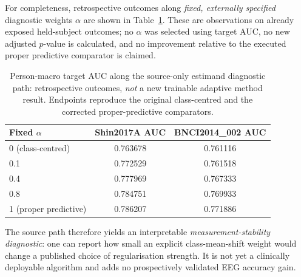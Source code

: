 For completeness, retrospective outcomes along
\emph{fixed, externally specified} diagnostic
weights $\alpha$ are shown in
Table~\ref{tab:v19-homotopy-outcomes}. These are
observations on already exposed held-subject
outcomes; no $\alpha$ was selected using target
AUC, no new adjusted $p$-value is calculated, and
no improvement relative to the executed proper
predictive comparator is claimed.
\begin{table}[tb]
\centering
\small
\caption{Person-macro target AUC along the source-only
estimand diagnostic path: retrospective outcomes,
\emph{not} a new trainable adaptive method result.
Endpoints reproduce the original class-centred
and the corrected proper-predictive comparators.}
\label{tab:v19-homotopy-outcomes}
\begin{tabular}{lcc}
\toprule
Fixed $\alpha$ & Shin2017A AUC & BNCI2014\_002 AUC\\
\midrule
0 (class-centred) & 0.763678 & 0.761116\\
0.1 & 0.772529 & 0.761518\\
0.4 & 0.777969 & 0.767333\\
0.8 & 0.784751 & 0.769933\\
1 (proper predictive) & 0.786207 & 0.771886\\
\bottomrule
\end{tabular}
\end{table}

The source path therefore yields an interpretable
\emph{measurement-stability diagnostic}: one can
report how small an explicit class-mean-shift
weight would change a published choice of
regularisation strength. It is not yet a
clinically deployable algorithm and adds no
prospectively validated EEG accuracy gain.
